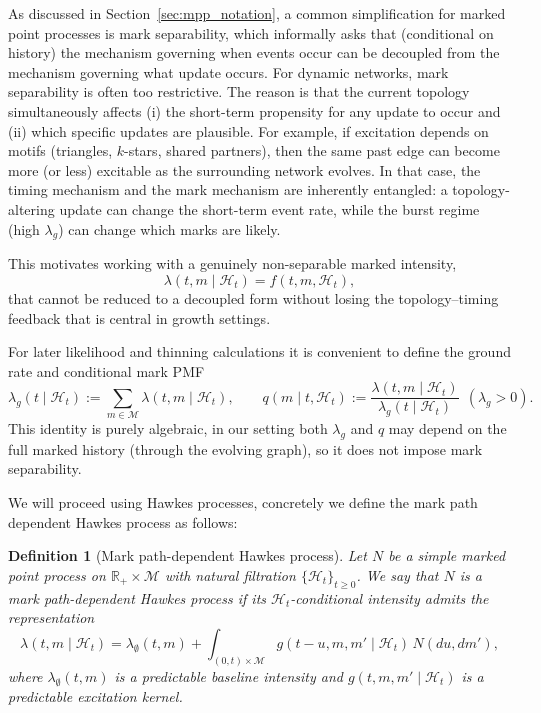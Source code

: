 \documentclass[12pt]{article}
\newtheorem{definition}[theorem]{Definition}
\begin{document}
As discussed in Section~\ref{sec:mpp_notation}, a common simplification for marked point processes is mark separability, which informally asks that (conditional on history) the mechanism governing when events occur can be decoupled from the mechanism governing what update occurs. For dynamic networks, mark separability is often too restrictive. The reason is that the current topology simultaneously affects (i) the short-term propensity for any update to occur and (ii) which specific updates are plausible. For example, if excitation depends on motifs (triangles, $k$-stars, shared partners), then the same past edge can become more (or less) excitable as the surrounding network evolves. In that case, the timing mechanism and the mark mechanism are inherently entangled: a topology-altering update can change the short-term event rate, while the burst regime (high $\lambda_g$) can change which marks are likely.

This motivates working with a genuinely non-separable marked intensity,
\begin{equation}
\label{eq:non_sep_mpd}
\lambda(t,m\mid\mathcal H_t)=f(t,m,\mathcal H_t),
\end{equation}
that cannot be reduced to a decoupled form without losing the topology--timing feedback that is central in growth settings.

For later likelihood and thinning calculations it is convenient to define the ground rate and conditional mark PMF
\[
\lambda_g(t\mid\mathcal H_t):=\sum_{m\in\mathcal M}\lambda(t,m\mid\mathcal H_t),
\qquad
q(m\mid t,\mathcal H_t):=\frac{\lambda(t,m\mid\mathcal H_t)}{\lambda_g(t\mid\mathcal H_t)}\ \ (\lambda_g>0).
\]
This identity is purely algebraic, in our setting both $\lambda_g$ and $q$ may depend on the full marked history (through the evolving graph), so it does not impose mark separability.

We will proceed using Hawkes processes, concretely we define the mark path dependent Hawkes process as follows:

\begin{definition}[Mark path-dependent Hawkes process]\label{def:mpd}
Let $N$ be a simple marked point process on $\mathbb{R}_+ \times \mathcal{M}$ with
natural filtration $\{\mathcal{H}_t\}_{t \ge 0}$.  
We say that $N$ is a \emph{mark path-dependent Hawkes process} if its
$\mathcal{H}_t$-conditional intensity admits the representation
\begin{equation}
\lambda(t,m \mid \mathcal{H}_t)
=
\lambda_{\emptyset}(t,m)
+
\int_{(0,t)\times\mathcal{M}}
g\!\left(t-u, m, m' \mid \mathcal{H}_t\right)\,
N(du,dm'),
\label{eq:path_dependent_marked_hawkes}
\end{equation}
where $\lambda_{\emptyset}(t,m)$ is a predictable baseline intensity and
$g(t,m, m' \mid \mathcal{H}_t)$ is a predictable excitation kernel.
\end{definition}
\end{document}
